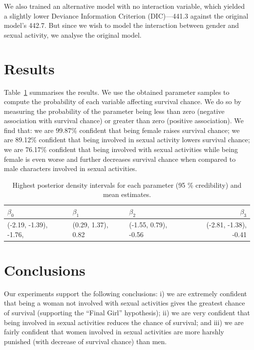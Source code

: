 \documentclass[10pt]{article}
\begin{document}
We also trained an alternative model with no interaction variable, which yielded a slightly lower Deviance Information Criterion (DIC)---441.3 against the original model's 442.7. But since we wish to model the interaction between gender and sexual activity, we analyse the original model.

\section{Results}\label{results}
Table~\ref{tab:results} summarises the results. We use the obtained parameter samples to compute the probability of each variable affecting survival chance. We do so by measuring the probability of the parameter being less than zero (negative association with survival chance) or greater than zero (positive association). We find that: we are 99.87\% confident that being female raises survival chance; we are 89.12\% confident that being involved in sexual activity lowers survival chance; we are 76.17\% confident that being involved with sexual activities while being female is even worse and further decreases survival chance when compared to male characters involved in sexual activities.

\begin{table}[hbtp]
    \centering
    \footnotesize
    \caption{Highest posterior density intervals for each parameter (95 \% credibility) and mean estimates.}
    \label{tab:results}
    \begin{tabularx}{\textwidth}{X X X r}
        \toprule
        $\beta_0$ & $\beta_1$ & $\beta_2$ & $\beta_3$\\
        \midrule 
        (-2.19, -1.39), -1.76,  & (0.29, 1.37), 0.82 & (-1.55, 0.79), -0.56& (-2.81, -1.38), -0.41 \\
        \bottomrule
       \end{tabularx}
\end{table}



\section{Conclusions}\label{conclusions}
Our experiments support the following conclusions: i) we are extremely confident that being a woman not involved with sexual activities gives the greatest chance of survival (supporting the ``Final Girl'' hypothesis); ii) we are very confident that being involved in sexual activities reduces the chance of survival; and iii) we are fairly confident that women involved in sexual activities are more harshly punished (with decrease of survival chance) than men.
\end{document}
